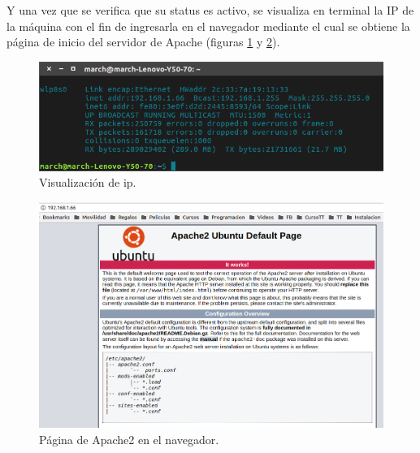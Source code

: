Y una vez que se verifica que su status es activo, se visualiza en terminal la IP de la máquina con el fin de ingresarla en el navegador mediante el cual se obtiene la página de inicio del servidor de Apache (figuras \ref{image:http3} y \ref{image:http4}).

\FloatBarrier
\begin{figure}[htbp!]
		\centering
			\includegraphics[width=.75 \textwidth]{images/http3}
		\caption{Visualización de ip.}
		\label{image:http3}
\end{figure}
\FloatBarrier

\FloatBarrier
\begin{figure}[htbp!]
		\centering
			\includegraphics[width=.75 \textwidth]{images/http4}
		\caption{Página de Apache2 en el navegador.}
		\label{image:http4}
\end{figure}
\FloatBarrier
